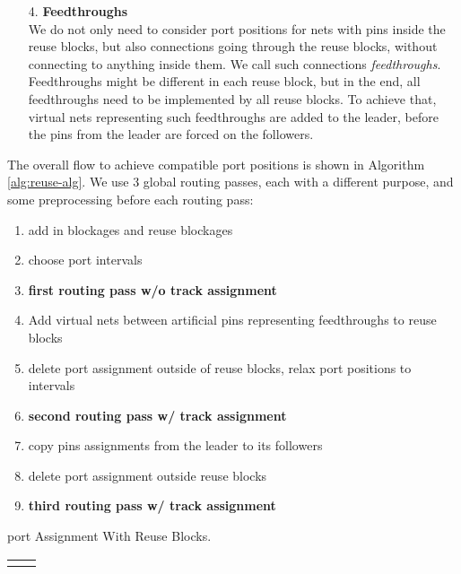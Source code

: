 \documentclass[a2paper]{bigsposter}
\begin{document}
\begin{blockrow}
\begin{enumerate}
\item [{4.}] \textbf{Feedthroughs}\\
We do not only need to consider port positions for nets with pins inside the reuse blocks, but also connections going through the reuse blocks, without connecting to anything inside them. We call such connections \textit{feedthroughs}.
Feedthroughs might be different in each reuse block, but in the end, all feedthroughs need to be implemented by all reuse blocks. To achieve that, virtual nets representing such feedthroughs are added to the leader, before the pins from the leader are forced on the followers.
\end{enumerate}
\blockbreak
{}
The overall flow to achieve compatible port positions is shown in Algorithm \ref{alg:reuse-alg}.
We use 3 global routing passes, each with a different purpose, and some preprocessing before each routing pass:
\begin{algorithm}[H] 
	\begin{enumerate}
		\item add in blockages and reuse blockages \label{step:add-blockages}
		\item choose port intervals  \label{PIstep}
		\item \textbf{first routing pass w/o track assignment} \label{step:pass1}
		\item Add virtual nets between artificial pins representing feedthroughs to reuse blocks \label{step:create-artificial-feedthroughs}
		\item delete port assignment outside of reuse blocks, relax port positions to intervals \label{step:relaxpositions}
		\item \textbf{second routing pass w/ track assignment}
		\item copy pins assignments from the leader to its followers \label{step:copy-pin-assignment}
		\item delete port assignment outside reuse blocks
		\item \textbf{third routing pass w/ track assignment}
	\end{enumerate} %
	\caption{port Assignment With Reuse Blocks.}
	\label{alg:reuse-alg}
\end{algorithm}
\begin{tabular}{cc}
	\begin{minipage}{0.5\blockwidth}


\end{minipage}
\end{tabular}
\end{blockrow}
\end{document}
